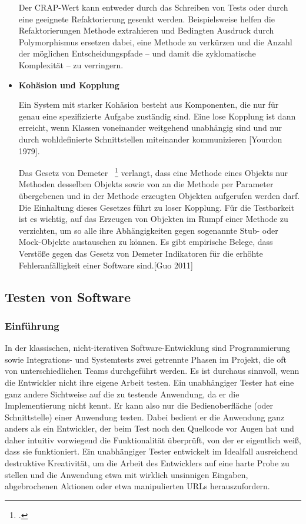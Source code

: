 \begin{itemize}
    Der CRAP-Wert kann entweder durch das Schreiben von Tests oder durch eine geeignete Refaktorierung gesenkt werden. Beispielsweise helfen die Refaktorierungen Methode extrahieren und Bedingten Ausdruck durch Polymorphismus ersetzen dabei, eine Methode zu verkürzen und die Anzahl der möglichen Entscheidungspfade – und damit die zyklomatische Komplexität – zu verringern. %
    
    \item \textbf{Kohäsion und Kopplung}
    
    Ein System mit starker Kohäsion besteht aus Komponenten, die nur für genau eine spezifizierte Aufgabe zuständig sind. Eine lose Kopplung ist dann erreicht, wenn Klassen voneinander weitgehend unabhängig sind und nur durch wohldefinierte Schnittstellen miteinander kommunizieren [Yourdon 1979].
    
    Das Gesetz von Demeter ~\footcite[Vgl. Seite 67-78]{Lieberherr.1989} verlangt, dass eine Methode eines Objekts nur Methoden desselben 
    Objekts sowie von an die Methode per Parameter übergebenen und in der Methode erzeugten Objekten aufgerufen werden darf. Die Einhaltung dieses Gesetzes führt zu loser Kopplung. Für die Testbarkeit ist es wichtig, auf das Erzeugen von Objekten im Rumpf einer Methode zu verzichten, um so alle ihre Abhängigkeiten gegen sogenannte Stub- oder Mock-Objekte austauschen zu können. Es gibt empirische Belege, dass Verstöße gegen das Gesetz von Demeter Indikatoren für die erhöhte Fehleranfälligkeit einer Software sind.[Guo 2011]
    
\end{itemize}

\subsection{Testen von Software}\label{arten-von-tests} 
\subsubsection{Einführung} %
In der klassischen, nicht-iterativen Software-Entwicklung sind Programmierung sowie
Integrations- und Systemtests zwei getrennte Phasen im Projekt, die oft von unterschiedlichen
Teams durchgeführt werden. Es ist durchaus sinnvoll, wenn die Entwickler nicht
ihre eigene Arbeit testen. Ein unabhängiger Tester hat eine ganz andere Sichtweise auf
die zu testende Anwendung, da er die Implementierung nicht kennt. Er kann also nur
die Bedienoberfläche (oder Schnittstelle) einer Anwendung testen. Dabei bedient er die
Anwendung ganz anders als ein Entwickler, der beim Test noch den Quellcode vor Augen hat
und daher intuitiv vorwiegend die Funktionalität überprüft, von der er eigentlich weiß,
dass sie funktioniert. Ein unabhängiger Tester entwickelt im Idealfall ausreichend destruktive Kreativität, um die Arbeit des Entwicklers auf eine harte Probe zu stellen und die Anwendung etwa mit wirklich unsinnigen Eingaben, abgebrochenen Aktionen oder etwa manipulierten URLs herauszufordern.


